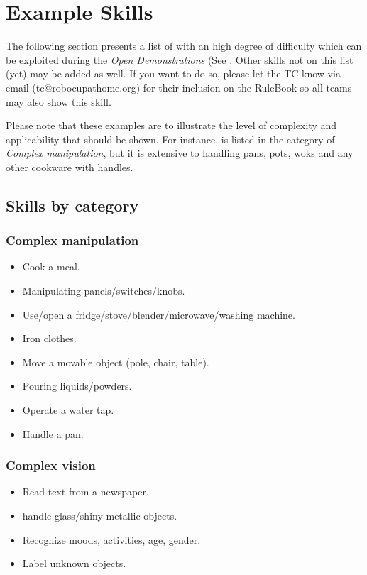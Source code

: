 \chapter{Example Skills}
\label{chap:example-skills}

The following section presents a list of  with an high degree of difficulty which can be exploited during the \textit{Open Demonstrations} (See .
Other skills not on this list (yet) may be added as well. If you want to do so, please let the TC know via email (tc@robocupathome.org) for their inclusion on the RuleBook so all teams may also show this skill.

Please note that these examples are to illustrate the level of complexity and applicability that should be shown. For instance,  is listed in the category of \textit{Complex manipulation}, but it is extensive to handling pans, pots, woks and any other cookware with handles.

\section{Skills by category}

\subsection{Complex manipulation}
\begin{itemize}
	\item Cook a meal.
	\item Manipulating panels/switches/knobs.
	\item Use/open a fridge/stove/blender/microwave/washing machine.
	\item Iron clothes.
	\item Move a movable object (pole, chair, table).
	\item Pouring liquids/powders.
	\item Operate a water tap.
	\item Handle a pan.
\end{itemize}

\subsection{Complex vision}
\begin{itemize}
	\item Read text from a newspaper.
	\item handle glass/shiny-metallic objects.
	\item Recognize moods, activities, age, gender.
	\item Label unknown objects.
\end{itemize}

